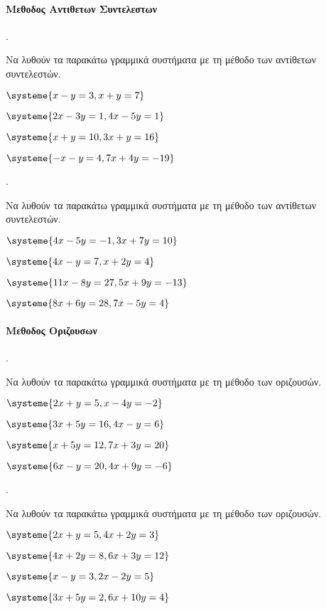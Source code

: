 \documentclass[11pt,a4paper,twocolumn]{article}
\newcounter{askhsh}
\newcommand{\askhsh}{\large\theaskhsh.\ \addtocounter{askhsh}{1}}
\begin{document}
\paragraph{Μεθοδος Αντιθετων Συντελεστων}
\askhsh Να λυθούν τα παρακάτω γραμμικά συστήματα με τη μέθοδο των αντίθετων συντελεστών.
\begin{multicols}{2}
\begin{alist}
\item $ \systeme{x-y=3,x+y=7} $
\item $ \systeme{2x-3y=1,4x-5y=1} $
\item $ \systeme{x+y=10,3x+y=16} $
\item $ \systeme{-x-y=4,7x+4y=-19} $
\end{alist}
\end{multicols}
\askhsh Να λυθούν τα παρακάτω γραμμικά συστήματα με τη μέθοδο των αντίθετων συντελεστών.
\begin{multicols}{2}
\begin{alist}
\item $ \systeme{4x-5y=-1,3x+7y=10} $
\item $ \systeme{4x-y=7,x+2y=4} $
\item $ \systeme{11x-8y=27,5x+9y=-13} $
\item $ \systeme{8x+6y=28,7x-5y=4} $
\end{alist}
\end{multicols}
\paragraph{Μεθοδος Οριζουσων}
\askhsh Να λυθούν τα παρακάτω γραμμικά συστήματα με τη μέθοδο των οριζουσών.
\begin{multicols}{2}
\begin{alist}
\item $ \systeme{2x+y=5,x-4y=-2} $
\item $ \systeme{3x+5y=16,4x-y=6} $
\item $ \systeme{x+5y=12,7x+3y=20} $
\item $ \systeme{6x-y=20,4x+9y=-6} $
\end{alist}
\end{multicols}
\askhsh Να λυθούν τα παρακάτω γραμμικά συστήματα με τη μέθοδο των οριζουσών.
\begin{multicols}{2}
\begin{alist}
\item $ \systeme{2x+y=5,4x+2y=3} $
\item $ \systeme{4x+2y=8,6x+3y=12} $
\item $ \systeme{x-y=3,2x-2y=5} $
\item $ \systeme{3x+5y=2,6x+10y=4} $
\end{alist}
\end{multicols}
\end{document}
